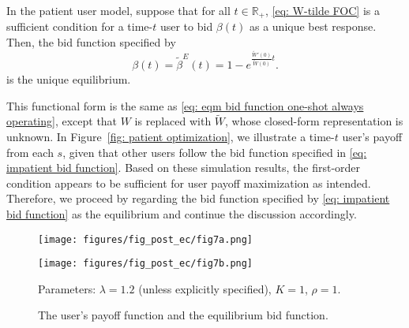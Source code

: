 \documentclass[12pt, letterpaper]{article}
\begin{document}
\begin{thm}
    In the patient user model, suppose that for all $t \in \mathbb{R}_+$, \eqref{eq: W-tilde FOC} is a sufficient condition for a time-$t$ user to bid $\beta(t)$ as a unique best response. Then, the bid function specified by
    \begin{equation}\label{eq: impatient bid function}
        \beta(t) = \tilde{\beta}^E(t) = 1 - e^{\frac{\tilde{W}'(0)}{\tilde{W}(0)}t}.
    \end{equation}
    is the unique equilibrium.
\end{thm}

This functional form is the same as \eqref{eq: eqm bid function one-shot always operating}, except that $W$ is replaced with $\tilde{W}$, whose closed-form representation is unknown. In Figure~\ref{fig: patient optimization}, we illustrate a time-$t$ user's payoff from each $s$, given that other users follow the bid function specified in \eqref{eq: impatient bid function}. Based on these simulation results, the first-order condition appears to be sufficient for user payoff maximization as intended. Therefore, we proceed by regarding the bid function specified by \eqref{eq: impatient bid function} as the equilibrium and continue the discussion accordingly.



\begin{figure}[tb]
    \centering
    \begin{minipage}[t]{0.475\textwidth}
        \centering
        \texttt{[image: figures/fig\_post\_ec/fig7a.png]}
        \label{fig: patient optimization}
    \end{minipage}
    \hfill
    \begin{minipage}[t]{0.475\textwidth}  
        \centering 
        \texttt{[image: figures/fig\_post\_ec/fig7b.png]}
        \label{fig: patient beta}
    \end{minipage}
    \caption{The user's payoff function and the equilibrium bid function.}
    \begin{center}\footnotesize
        Parameters: $\lambda = 1.2$ (unless explicitly specified), $K = 1$, $\rho = 1$.
    \end{center}
    \label{fig: patient optimization and beta}
\end{figure}
\end{document}
